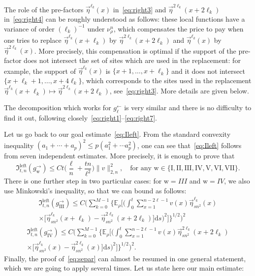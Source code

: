\documentclass[10pt]{amsart}
\theoremstyle{definition}\newtheorem{defi}[theo]{Definition}\newtheorem{rema}[theo]{Remark}\newtheorem{exam}[theo]{Example}\newtheorem{exem}[theo]{Example}\newtheorem{nota}[theo]{Notation}
\newcommand*{\rmw}{\mathrm{w}}
\newcommand*{\rmI}{\mathrm{I}}
\newcommand*{\rmII}{\mathrm{II}}
\newcommand*{\rmIII}{\mathrm{III}}
\newcommand*{\rmIV}{\mathrm{IV}}
\newcommand*{\rmV}{\mathrm{V}}
\newcommand*{\rmVI}{\mathrm{VI}}
\newcommand*{\rmVII}{\mathrm{VII}}
\newcommand{\bb}[1]{{\mathbb #1}}
\newcommand{\mf}[1]{{\mathfrak #1}}
\renewcommand\vec[1]{\overrightarrow{#1}}
\renewcommand{\leq}{\leqslant}
\newcommand*{\dd}{\mathrm{d}}
\newcommand*{\ds}{\dd s}
\begin{document}
The role of the pre-factors $\vec\eta^{\ell_k}(x)$ in~\eqref{eq:right3} and $\vec\eta^{2\ell_k}(x+2\ell_k)$ in~\eqref{eq:right4} can be roughly understood as follows: these local functions have a variance of order $(\ell_k)^{-1}$ under $\nu^n_\rho$, which compensates the price to pay when one tries to replace $\vec\eta^{\ell_k}(x+\ell_k)$ by $\vec\eta^{2\ell_k}(x+2\ell_k)$ and $\vec\eta^{\ell_k}(x)$ by $\vec\eta^{2\ell_k}(x)$. More precisely, this compensation is optimal if the support of the pre-factor does not intersect the set of sites which are used in the replacement: for example, the support of $\vec\eta^{\ell_k}(x)$ is $\{x+1,\dots,x+\ell_k\}$ and it does not intersect $\{x+\ell_k+1,\dots,x+4\ell_k\}$, which corresponds to the sites used in the replacement $\vec\eta^{\ell_k}(x+\ell_k)\mapsto \vec\eta^{2\ell_k}(x+2\ell_k)$, see~\eqref{eq:right3}. More details are given below.

The decomposition which works for $g^\leftarrow_\ell$ is very similar and there is no difficulty to find it out, following closely~\eqref{eq:right1}--\eqref{eq:right7}.

Let us go back to our goal estimate~\eqref{eq:Ileft}. From the standard convexity inequality $(a_1+\cdots+a_p)^2 \leq p(a_1^2+\cdots a_p^2)$, one can see that~\eqref{eq:Ileft} follows from seven independent estimates. More precisely, it is enough to prove that
\begin{equation}\label{eq:separ}
\mf I_{t,n}^{\mathrm{left}}(g^\rightarrow_{\rmw}) \leq Ct\bigg(\frac{\ell}{n}+\frac{tn}{\ell^2}\bigg)\|v\|_{2,n}^2, \quad \text{for any } {\rmw} \in \{\rmI, \rmII, \rmIII, \rmIV, \rmV, \rmVI, \rmVII\}.
\end{equation}
There is one further step in two particular cases: for $\rmw=III$ and $\rmw=IV$, we also use Minkowski's inequality, so that we can bound as follows:
\begin{multline}
\mf I_{t,n}^{\mathrm{left}}(g^\rightarrow_{\rmIII}) \leq C\bigg(\sum_{k=0}^{M-1} \bigg\{\bb E_\rho\bigg[\bigg(\int_0^t \sum_{x=1}^{n-2\ell-1} v(x)\vec\eta_{sn^2}^{\ell_k}(x)\\
\times \Big[\vec\eta_{sn^2}^{\ell_k}(x+\ell_k)-\vec\eta_{sn^2}^{2\ell_k}(x+2\ell_k)\Big]\ds\bigg)^2\bigg] \bigg\}^{1/2} \bigg)^2 \label{eq:right3bis}
\end{multline}
\begin{multline}
\mf I_{t,n}^{\mathrm{left}}(g^\rightarrow_{\rmIV}) \leq C\bigg(\sum_{k=0}^{M-1} \bigg\{\bb E_\rho\bigg[\bigg(\int_0^t \sum_{x=1}^{n-2\ell-1} v(x)\vec\eta_{sn^2}^{2\ell_k}(x+2\ell_k) \\
\times \Big[\vec\eta_{sn^2}^{\ell_k}(x)-\vec\eta_{sn^2}^{2\ell_k}(x)\Big]\ds\bigg)^2\bigg] \bigg\}^{1/2} \bigg)^2.\label{eq:right4bis}
\end{multline}
Finally, the proof of~\eqref{eq:separ} can almost be resumed in one general statement, which we are going to apply several times. Let us state here our main estimate:
\end{document}
